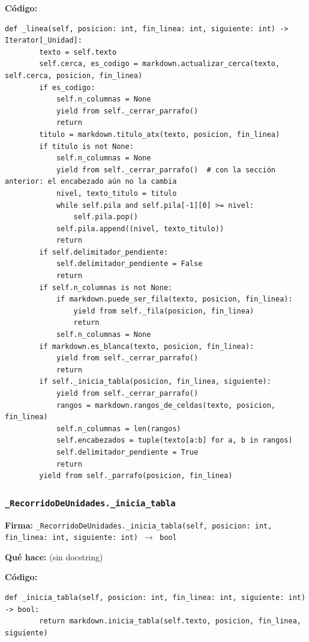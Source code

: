 \documentclass[11pt,a4paper]{article}
\begin{document}
\textbf{Código:}
\begin{lstlisting}
def _linea(self, posicion: int, fin_linea: int, siguiente: int) -> Iterator[_Unidad]:
        texto = self.texto
        self.cerca, es_codigo = markdown.actualizar_cerca(texto, self.cerca, posicion, fin_linea)
        if es_codigo:
            self.n_columnas = None
            yield from self._cerrar_parrafo()
            return
        titulo = markdown.titulo_atx(texto, posicion, fin_linea)
        if titulo is not None:
            self.n_columnas = None
            yield from self._cerrar_parrafo()  # con la sección anterior: el encabezado aún no la cambia
            nivel, texto_titulo = titulo
            while self.pila and self.pila[-1][0] >= nivel:
                self.pila.pop()
            self.pila.append((nivel, texto_titulo))
            return
        if self.delimitador_pendiente:
            self.delimitador_pendiente = False
            return
        if self.n_columnas is not None:
            if markdown.puede_ser_fila(texto, posicion, fin_linea):
                yield from self._fila(posicion, fin_linea)
                return
            self.n_columnas = None
        if markdown.es_blanca(texto, posicion, fin_linea):
            yield from self._cerrar_parrafo()
            return
        if self._inicia_tabla(posicion, fin_linea, siguiente):
            yield from self._cerrar_parrafo()
            rangos = markdown.rangos_de_celdas(texto, posicion, fin_linea)
            self.n_columnas = len(rangos)
            self.encabezados = tuple(texto[a:b] for a, b in rangos)
            self.delimitador_pendiente = True
            return
        yield from self._parrafo(posicion, fin_linea)
\end{lstlisting}

\subsubsection*{\texttt{\_RecorridoDeUnidades.\_inicia\_tabla}}
\textbf{Firma:} \texttt{\_RecorridoDeUnidades.\_inicia\_tabla(self, posicion: int, fin\_linea: int, siguiente: int) $\rightarrow$ bool}

\textbf{Qué hace:} (sin docstring)

\textbf{Código:}
\begin{lstlisting}
def _inicia_tabla(self, posicion: int, fin_linea: int, siguiente: int) -> bool:
        return markdown.inicia_tabla(self.texto, posicion, fin_linea, siguiente)
\end{lstlisting}
\end{document}
